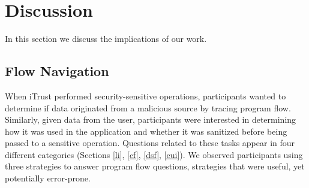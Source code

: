 \documentclass[10pt,journal,compsoc]{IEEEtran}
\begin{document}










\section{Discussion}
\label{sec:discussion}
In this section we discuss the implications of our work.

\subsection{Flow Navigation}
\label{flowNav}
When iTrust performed security-sensitive operations, participants wanted to determine if data originated from a malicious source
by tracing program flow.
Similarly, given data from the user, participants were interested in determining how it was used in the application and whether it was sanitized before being passed to a sensitive operation. Questions related to these tasks appear in four different categories (Sections \ref{li}, \ref{cf}, \ref{dsf}, \ref{eui}).
We observed participants using three strategies to answer program flow questions,
strategies that were useful, yet potentially error-prone.
\end{document}
